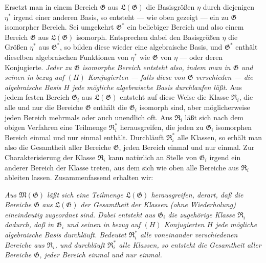 Ersetzt man in einem Bereich $\mathfrak G$ aus $\mathfrak L(\mathfrak G)$ die
Basisgrößen $\eta$ durch diejenigen $\eta^*$ irgend einer anderen Basis, so
entsteht --- wie oben gezeigt --- ein zu $\mathfrak G$ isomorpher Bereich. Sei
umgekehrt $\mathfrak G^*$ ein beliebiger Bereich und also einem Bereich
$\mathfrak G$ aus $\mathfrak L(\mathfrak G)$ isomorph. Entsprechen dabei den
Basisgrößen $\eta$ die Größen $\eta^*$ aus $\mathfrak G^*$, so bilden diese
wieder eine algebraische Basis, und $\mathfrak G^*$ enthält dieselben
algebraischen Funktionen von $\eta^*$ wie $\mathfrak G$ von $\eta$ --- oder
deren Konjugierte. \emph{Jeder zu $\mathfrak G$ isomorphe Bereich entsteht also,
indem man in $\mathfrak G$ und seinen in bezug auf $(H)$ Konjugierten} \emph{--- falls diese von $\mathfrak G$ verschieden --- die
algebraische Basis $H$ jede mögliche algebraische Basis durchlaufen läßt.} Aus
jedem festen Bereich $\mathfrak G_i$ aus $\mathfrak L(\mathfrak G)$ entsteht auf
diese Weise die Klasse $\mathfrak R_i$, die alle und nur die Bereiche
$\mathfrak G$ enthält die $\mathfrak G_i$ isomorph sind, aber möglicherweise
jeden Bereich mehrmals oder auch unendlich oft. Aus $\mathfrak R_i$ läßt sich
nach dem obigen Verfahren eine Teilmenge $\mathfrak R_i^*$ herausgreifen, die
jeden zu $\mathfrak G_i$ isomorphen Bereich einmal und nur einmal enthält.
Durchläuft $\mathfrak R_i^*$ alle Klassen, so erhält man also die Gesamtheit
aller Bereiche $\mathfrak G$, jeden Bereich einmal und nur einmal. Zur
Charakterisierung der Klasse $\mathfrak R_i$ kann natürlich an Stelle von
$\mathfrak G_i$ irgend ein anderer Bereich der Klasse treten, aus dem sich wie
oben alle Bereiche aus $\mathfrak R_i$ ableiten lassen. Zusammenfassend erhalten
wir:

\emph{Aus $\mathfrak M(\mathfrak G)$ läßt sich eine Teilmenge
$\mathfrak L(\mathfrak G)$ herausgreifen, derart, daß die Bereiche $\mathfrak G$
aus $\mathfrak L(\mathfrak G)$ der Gesamtheit der Klassen (ohne Wiederholung)
eineindeutig zugeordnet sind. Dabei entsteht aus $\mathfrak G_i$ die zugehörige
Klasse $\mathfrak R_i$ dadurch, daß in $\mathfrak G_i$ und seinen in bezug auf
$(H)$ Konjugierten $H$ jede mögliche algebraische Basis durchläuft. Bedeutet
$\mathfrak R_i^*$ alle voneinander verschiedenen Bereiche aus $\mathfrak R_i$,
und durchläuft $\mathfrak R_i^*$ alle Klassen, so entsteht die Gesamtheit aller
Bereiche $\mathfrak G$, jeder Bereich einmal und nur einmal.}

